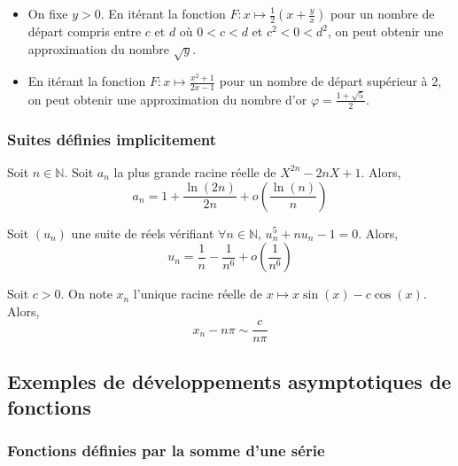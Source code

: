   \begin{example}
    \begin{itemize}
      \item On fixe $y > 0$. En itérant la fonction $F : x \mapsto \frac{1}{2} \left( x + \frac{y}{x} \right)$ pour un nombre de départ compris entre $c$ et $d$ où $0 < c < d$ et $c^2 < 0 < d^2$, on peut obtenir une approximation du nombre $\sqrt{y}$.
      \item En itérant la fonction $F : x \mapsto \frac{x^2+1}{2x-1}$ pour un nombre de départ supérieur à $2$, on peut obtenir une approximation du nombre d'or $\varphi = \frac{1+\sqrt{5}}{2}$.
    \end{itemize}
  \end{example}

  \subsubsection{Suites définies implicitement}


  \begin{example}
    Soit $n \in \mathbb{N}$. Soit $a_n$ la plus grande racine réelle de $X^{2n} - 2n X + 1$. Alors,
    \[ a_n = 1 + \frac{\ln(2n)}{2n} + o\left( \frac{\ln(n)}{n} \right) \]
  \end{example}

  \begin{example}
    Soit $(u_n)$ une suite de réels vérifiant $\forall n \in \mathbb{N}, \, u_n^5 + nu_n - 1 = 0$. Alors,
    \[ u_n = \frac{1}{n} - \frac{1}{n^6} + o \left( \frac{1}{n^6} \right) \]
  \end{example}

  \begin{example}
    Soit $c > 0$. On note $x_n$ l'unique racine réelle de $x \mapsto x \sin(x) - c \cos(x)$. Alors,
    \[ x_n - n\pi \sim \frac{c}{n\pi} \]
  \end{example}

  \subsection{Exemples de développements asymptotiques de fonctions}

  \subsubsection{Fonctions définies par la somme d'une série}

